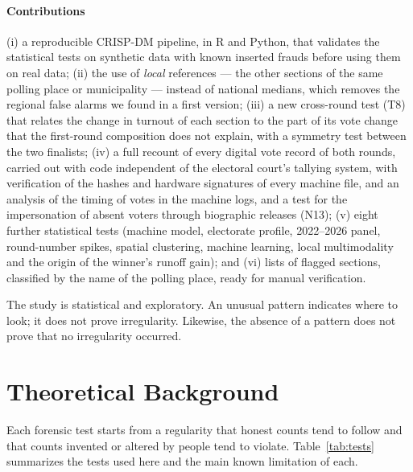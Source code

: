 \documentclass[fleqn,10pt]{SelfArx}
\begin{document}
\paragraph{Contributions} (i) a reproducible CRISP-DM pipeline, in R and
Python, that validates the statistical tests on synthetic data with known
inserted frauds before using them on real data; (ii) the use of
\emph{local} references --- the other sections of the same polling place or
municipality --- instead of national medians, which removes the regional
false alarms we found in a first version; (iii) a new cross-round test (T8)
that relates the change in turnout of each section to the part of its vote
change that the first-round composition does not explain, with a symmetry
test between the two finalists; (iv) a full recount of every digital vote
record of both rounds, carried out with code independent of the electoral
court's tallying system, with verification of the hashes and
hardware signatures of every machine file, and an analysis of the timing of
votes in the machine logs, and a test for the impersonation of absent voters
through biographic releases (N13); (v) eight further statistical tests (machine
model, electorate profile, 2022--2026 panel, round-number spikes, spatial
clustering, machine learning, local multimodality and the origin of the
winner's runoff gain); and (vi) lists of
flagged sections, classified by the name of the polling place, ready for
manual verification.

The study is statistical and exploratory. An unusual pattern indicates
where to look; it does not prove irregularity. Likewise, the absence of a
pattern does not prove that no irregularity occurred.

\section{Theoretical Background}
\label{sec:background}

Each forensic test starts from a regularity that honest counts tend to
follow and that counts invented or altered by people tend to violate.
Table~\ref{tab:tests} summarizes the tests used here and the main known
limitation of each.
\end{document}

